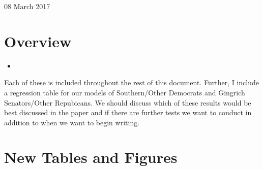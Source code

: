 \documentclass[12pt]{article}
\begin{document}
	
\begin{center}
	\Large 08 March 2017
\end{center}

\section{Overview}

\begin{itemize}
	\item 
\end{itemize}

\noindent
Each of these is included throughout the rest of this document. Further, I include a regression table for our models of Southern/Other Democrats and Gingrich Senators/Other Repubicans. We should discuss which of these results would be best discussed in the paper and if there are further tests we want to conduct in addition to when we want to begin writing.


\section{New Tables and Figures}
\end{document}
